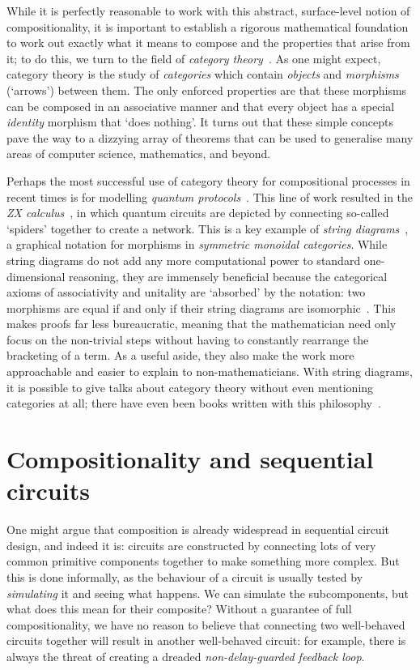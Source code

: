 While it is perfectly reasonable to work with this abstract, surface-level
notion of compositionality, it is important to establish a rigorous mathematical
foundation to work out exactly what it means to compose and the properties that
arise from it; to do this, we turn to the field of
\emph{category theory}~\cite{maclane1978categories}.
As one might expect, category theory is the study of \emph{categories} which
contain \emph{objects} and \emph{morphisms} (`arrows') between them.
The only enforced properties are that these morphisms can be composed in an
associative manner and that every object has a special \emph{identity} morphism
that `does nothing'.
It turns out that these simple concepts pave the way to a dizzying array of
theorems that can be used to generalise many areas of computer science,
mathematics, and beyond.

Perhaps the most successful use of category theory for compositional processes
in recent times is for modelling
\emph{quantum protocols}~\cite{abramsky2004categorical}.
This line of work resulted in the
\emph{ZX calculus}~\cite{coecke2008interacting}, in which quantum
circuits are depicted by connecting so-called `spiders' together to create a
network.
This is a key example of \emph{string diagrams}~\cite{joyal1991geometry},
a graphical notation for morphisms in \emph{symmetric monoidal categories}.
While string diagrams do not add any more computational power to
standard one-dimensional reasoning, they are
immensely beneficial because the categorical axioms of associativity and
unitality are `absorbed' by the notation: two morphisms are equal if and only if
their string diagrams are isomorphic~\cite{kelly1980coherence,kissinger2014abstract}.
This makes proofs far less bureaucratic, meaning that the mathematician need
only focus on the non-trivial steps without having to constantly rearrange the
bracketing of a term.
As a useful aside, they also make the work more approachable and easier to
explain to non-mathematicians.
With string diagrams, it is possible to give talks about category theory without
even mentioning categories at all; there have even been books written with this
philosophy~\cite{coecke2018picturing}.

\section{Compositionality and sequential circuits}

One might argue that composition is already widespread in sequential circuit
design, and indeed it is: circuits are constructed by connecting lots of very
common primitive components together to make something more complex.
But this is done informally, as the behaviour of a circuit is usually tested
by \emph{simulating} it and seeing what happens.
We can simulate the subcomponents, but what does this mean for their composite?
Without a guarantee of full compositionality, we have no reason to
believe that connecting two well-behaved circuits together will result in
another well-behaved circuit: for example, there is always the threat of
creating a dreaded \emph{non-delay-guarded feedback loop}.

